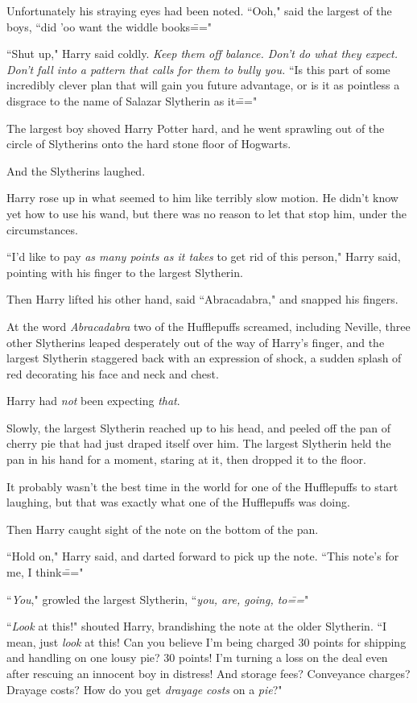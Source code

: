 Unfortunately his straying eyes had been noted. ``Ooh," said the largest of the boys, ``did 'oo want the widdle books\==="

``Shut up," Harry said coldly. \emph{Keep them off balance. Don't do what they expect. Don't fall into a pattern that calls for them to bully you.} ``Is this part of some incredibly clever plan that will gain you future advantage, or is it as pointless a disgrace to the name of Salazar Slytherin as it\==="

The largest boy shoved Harry Potter hard, and he went sprawling out of the circle of Slytherins onto the hard stone floor of Hogwarts.

And the Slytherins laughed.

Harry rose up in what seemed to him like terribly slow motion. He didn't know yet how to use his wand, but there was no reason to let that stop him, under the circumstances.

``I'd like to pay \emph{as many points as it takes} to get rid of this person," Harry said, pointing with his finger to the largest Slytherin.

Then Harry lifted his other hand, said ``Abracadabra," and snapped his fingers.

At the word \emph{Abracadabra} two of the Hufflepuffs screamed, including Neville, three other Slytherins leaped desperately out of the way of Harry's finger, and the largest Slytherin staggered back with an expression of shock, a sudden splash of red decorating his face and neck and chest.

Harry had \emph{not} been expecting \emph{that}.

Slowly, the largest Slytherin reached up to his head, and peeled off the pan of cherry pie that had just draped itself over him. The largest Slytherin held the pan in his hand for a moment, staring at it, then dropped it to the floor.

It probably wasn't the best time in the world for one of the Hufflepuffs to start laughing, but that was exactly what one of the Hufflepuffs was doing.

Then Harry caught sight of the note on the bottom of the pan.

``Hold on," Harry said, and darted forward to pick up the note. ``This note's for me, I think\==="

``\emph{You}," growled the largest Slytherin, ``\emph{you, are, going, to\===}"

``\emph{Look} at this!" shouted Harry, brandishing the note at the older Slytherin. ``I mean, just \emph{look} at this! Can you believe I'm being charged 30 points for shipping and handling on one lousy pie? 30 points! I'm turning a loss on the deal even after rescuing an innocent boy in distress! And storage fees? Conveyance charges? Drayage costs? How do you get \emph{drayage costs} on a \emph{pie}?"

